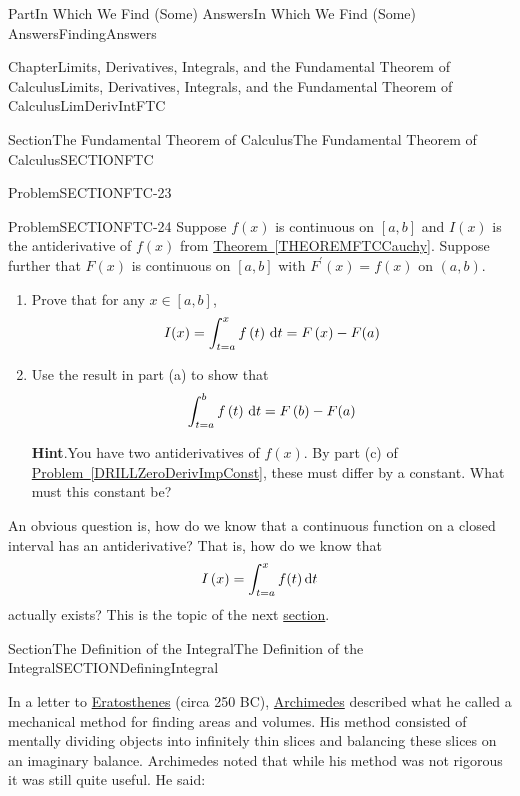 \documentclass[oneside,10pt,]{book}
\newcommand{\blocktitlefont}{\relax}
\newcommand{\xreffont}{\relax}
\numberwithin{equation}{part}
\newcommand{\dx}[1]{\,{\rm d}#1}
\begin{document}
\begin{partptx}{Part}{In Which We Find (Some) Answers}{}{In Which We Find (Some) Answers}{}{}{FindingAnswers}
\begin{chapterptx}{Chapter}{Limits, Derivatives, Integrals, and the Fundamental Theorem of Calculus}{}{Limits, Derivatives, Integrals, and the Fundamental Theorem of Calculus}{}{}{LimDerivIntFTC}
\begin{sectionptx}{Section}{The Fundamental Theorem of Calculus}{}{The Fundamental Theorem of Calculus}{}{}{SECTIONFTC}
\begin{problem}{Problem}{}{SECTIONFTC-23}
\end{problem}
\begin{problem}{Problem}{}{SECTIONFTC-24}%
Suppose \(f(x)\) is continuous on \([a,b]\) and \(I(x)\) is the antiderivative of \(f(x)\) from \hyperref[THEOREMFTCCauchy]{Theorem~{\xreffont\ref{THEOREMFTCCauchy}}}. Suppose further that \(F(x)\) is continuous on \([a,b]\) with \(F^\prime
(x)=f(x)\) on \((a,b)\).%
\begin{enumerate}[font=\bfseries,label=(\alph*),ref=\alph*]%
\item{}Prove that for any \(x\in
[a,b]\),%
\begin{equation*}
I(x)=\int^x_{t=a}{f\left(t\right)\dx{t}}=F\left(x\right)-F(a)
\end{equation*}
%
\item{}Use the result in part (a) to show that%
\begin{equation*}
\int^b_{t=a}{f\left(t\right)\dx{t}}=F\left(b\right)-F(a)
\end{equation*}
%
\par\smallskip%
\noindent\textbf{\blocktitlefont Hint}.\hypertarget{SECTIONFTC-24-3-2}{}\quad{}You have two antiderivatives of \(f(x)\).  By part (c) of \hyperref[DRILLZeroDerivImpConst]{Problem~{\xreffont\ref{DRILLZeroDerivImpConst}}}, these must differ by a constant.  What must this constant be?%
\end{enumerate}%
\end{problem}
An obvious question is, how do we know that a continuous function on a closed interval has an antiderivative? That is, how do we know that%
\begin{equation*}
I\left(x\right)=\int^x_{t=a}{f(t)\dx{t}}
\end{equation*}
actually exists? This is the topic of the next \hyperref[SECTIONDefiningIntegral]{section}.%
\end{sectionptx}
%
%
\typeout{************************************************}
\typeout{************************************************}
%
\begin{sectionptx}{Section}{The Definition of the Integral}{}{The Definition of the Integral}{}{}{SECTIONDefiningIntegral}
\begin{introduction}{}%
 In a letter to \href{https://mathshistory.st-andrews.ac.uk/Biographies/Eratosthenes/}{Eratosthenes} (circa 250 BC), \href{https://mathshistory.st-andrews.ac.uk/Biographies/Archimedes/}{Archimedes} described what he called a mechanical method for finding areas and volumes.  His method consisted of mentally dividing objects into infinitely thin slices and balancing these slices on an imaginary balance.  Archimedes noted that while his method was not rigorous it was still quite useful. He said:%

\end{introduction}
\end{sectionptx}
\end{chapterptx}
\end{partptx}
\end{document}
